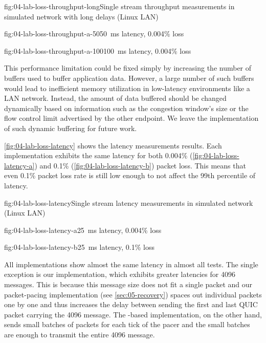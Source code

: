 \begin{myFigure}{fig:04-lab-loss-throughput-long}{Single stream throughput measurements in simulated network with long delays (Linux LAN)}
\begin{mySubfigure}{0.49\linewidth}{fig:04-lab-loss-throughput-a-50}{\SI{50}{\milli\second} latency, 0.004\% loss}
\footnotesize

\end{mySubfigure}
\begin{mySubfigure}{0.49\linewidth}{fig:04-lab-loss-throughput-a-100}{\SI{100}{\milli\second} latency, 0.004\% loss}
\footnotesize

\end{mySubfigure}
\end{myFigure}

This performance limitation could be fixed simply by increasing the number of buffers used to buffer
application data. However, a large number of such buffers would lead to inefficient memory
utilization in low-latency environments like a LAN network. Instead, the amount of data buffered
should be changed dynamically based on information such as the congestion window's size or the flow
control limit advertised by the other endpoint. We leave the implementation of such dynamic
buffering for future work.

\autoref{fig:04-lab-loss-latency} shows the latency measurements results. Each implementation
exhibits the same latency for both 0.004\% (\autoref{fig:04-lab-loss-latency-a}) and 0.1\%
(\autoref{fig:04-lab-loss-latency-b}) packet loss. This means that even 0.1\% packet loss rate is
still low enough to not affect the 99th percentile of latency.

\begin{myFigure}{fig:04-lab-loss-latency}{Single stream latency measurements in simulated network (Linux LAN)}
\begin{mySubfigure}{0.49\linewidth}{fig:04-lab-loss-latency-a}{\SI{25}{\milli\second} latency, 0.004\% loss}
\footnotesize

\end{mySubfigure}
\begin{mySubfigure}{0.49\linewidth}{fig:04-lab-loss-latency-b}{\SI{25}{\milli\second} latency, 0.1\% loss}
\footnotesize

\end{mySubfigure}
\end{myFigure}

All implementations show almost the same latency in almost all tests. The single exception is our
implementation, which exhibits greater latencies for \SI{4096}{\byte} messages. This is because this
message size does not fit a single packet and our \gls{packet-pacing} implementation (see
\autoref{sec:05-recovery}) spaces out individual packets one by one and thus increases the delay
between sending the first and last QUIC packet carrying the \SI{4096}{\byte} message. The
\libmsquic{}-based implementation, on the other hand, sends small batches of packets for each tick
of the pacer and the small batches are enough to transmit the entire \SI{4096}{\byte} message.

